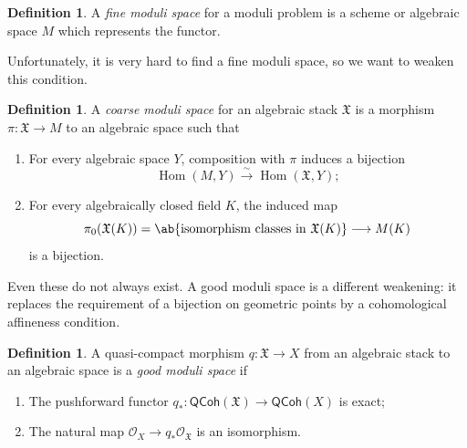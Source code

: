 \documentclass{amsart}
\theoremstyle{definition}
\newtheorem{defn}[thm]{Definition}
\theoremstyle{remark}
\theoremstyle{plain}
\theoremstyle{definition}
\theoremstyle{remark}
\newcommand{\mc}[1]{\mathcal{#1}}
\newcommand{\mf}[1]{\mathfrak{#1}}
\newcommand{\on}[1]{\operatorname{#1}}
\newcommand{\ms}[1]{\mathsf{#1}}
\newcommand{\1}{\mathbf{1}}
\newcommand{\2}{\mathbf{2}}
\newcommand{\3}{\mathbf{3}}
\begin{document}
\begin{defn}
    A \textit{fine moduli space} for a moduli problem is a scheme or algebraic space \(M\) which represents the functor. 
\end{defn}

Unfortunately, it is very hard to find a fine moduli space, so we want to weaken this condition.

\begin{defn}
    A \textit{coarse moduli space} for an algebraic stack \(\mf{X}\) is a morphism \(\pi\colon\mf{X}\to M\) to an algebraic space such that
    \begin{enumerate}
        \item For every algebraic space \(Y\), composition with \(\pi\) induces a bijection
        \[
            \on{Hom}(M,Y)\xrightarrow{\sim}\on{Hom}(\mf{X},Y);
        \]
        \item For every algebraically closed field \(K\), the induced map
        \[
            \pi_0(\mf{X}(K))=\ab\{\text{isomorphism classes in }\mf{X}(K)\}
            \longrightarrow M(K)
        \]
        is a bijection.
    \end{enumerate}
\end{defn}


Even these do not always exist. A good moduli space is a different weakening: it replaces the requirement of a bijection on geometric points by a cohomological affineness condition.

\begin{defn}
    A quasi-compact morphism \(q\colon\mf{X}\to X\) from an algebraic stack to an algebraic space is a \textit{good moduli space} if
    \begin{enumerate}
        \item The pushforward functor \(q_*\colon\ms{QCoh}(\mf{X})\to\ms{QCoh}(X)\) is exact;
        \item The natural map \(\mc{O}_X\to q_*\mc{O}_{\mf{X}}\) is an isomorphism.
    \end{enumerate}
\end{defn}
\end{document}
